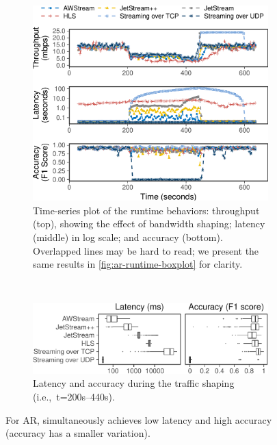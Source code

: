 \begin{figure}[t]
  \begin{subfigure}[t]{\columnwidth}
    \centering
    \includegraphics[width=0.95\columnwidth]{figures/runtime_darknet-timeseries.pdf}
    \caption{Time-series plot of the runtime behaviors: throughput (top),
      showing the effect of bandwidth shaping; latency (middle) in log scale;
      and accuracy (bottom). Overlapped lines may be hard to read; we present
      the same results in \autoref{fig:ar-runtime-boxplot} for clarity.}
    \label{fig:ar-runtime-timeseries}
  \end{subfigure}
  \vspace{0.2em}
  \\
  \begin{subfigure}[t]{\columnwidth}
    \centering
    \includegraphics[width=\columnwidth]{figures/runtime_darknet-boxplot.pdf}
    \caption{Latency and accuracy during the traffic shaping
      (i.e.,~t=200s--440s).}
    \label{fig:ar-runtime-boxplot}
  \end{subfigure}
  \caption{For AR, \sysname{} simultaneously achieves low latency and high
    accuracy (accuracy has a smaller variation).}
  \label{fig:ar-runtime}
  \vspace{-0.8em}
\end{figure}


